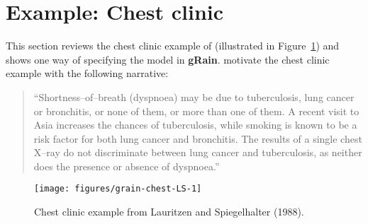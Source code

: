 \documentclass[10pt]{article}\usepackage[]{graphicx}\usepackage[]{color}
\makeatletter
\def\maxwidth{ %
  \ifdim\Gin@nat@width>\linewidth
    \linewidth
  \else
    \Gin@nat@width
  \fi
}
\newenvironment{knitrout}{}{} %
\def\grbn{{\bf gRain}}
\makeatother
\begin{document}





\section{Example: Chest clinic}
\label{sec:chest-clinic}
\label{sec:chest}



This section reviews the chest clinic example of \cite{lau/spieg:88}
(illustrated in Figure~\ref{fig:chest-LS}) and shows one way of
specifying the model in \grbn{}.  \cite{lau/spieg:88} motivate the
chest clinic example with the following narrative:

\begin{quote}
  ``Shortness--of--breath (dyspnoea) may be due to tuberculosis, lung
  cancer or bronchitis, or none of them, or more than one of them. A
  recent visit to Asia increases the chances of tuberculosis, while
  smoking is known to be a risk factor for both lung cancer and
  bronchitis. The results of a single chest X--ray do not discriminate
  between lung cancer and tuberculosis, as neither does the presence or
  absence of dyspnoea.''
\end{quote}


\begin{knitrout}
\color{fgcolor}\begin{figure}
\texttt{[image: figures/grain-chest-LS-1]} \caption[Chest clinic example from Lauritzen and Spiegelhalter (1988)]{Chest clinic example from Lauritzen and Spiegelhalter (1988).}\label{fig:chest-LS}
\end{figure}


\end{knitrout}
\end{document}
